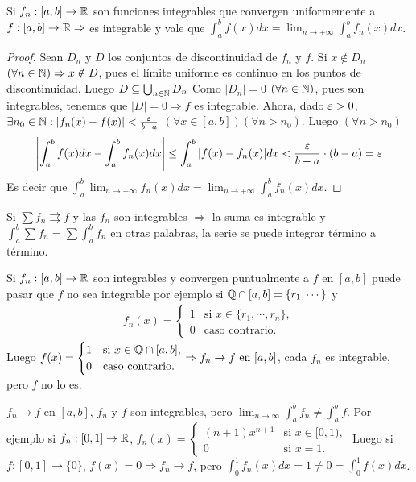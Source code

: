\begin{theorem}
  Si $f_n: [a, b] \to \mathbb{R}$ son funciones integrables que convergen uniformemente a $f: [a, b] \to \mathbb{R} \Rightarrow$ es integrable y vale que $\int_a^b f(x) dx = \lim_{n \to +\infty} \int_a^b f_n(x) dx$.
  \begin{proof}
    Sean $D_n$ y $D$ los conjuntos de discontinuidad de $f_n$ y $f$. Si $x \notin D_n$ $(\forall n \in \mathbb{N}) \Rightarrow x \notin D$,
    pues el límite uniforme es continuo en los puntos de discontinuidad.
    Luego $D \subseteq \bigcup_{n \in \mathbb{N}} D_n$ Como $|D_n| = 0$ $(\forall n \in \mathbb{N})$, pues son integrables,
    tenemos que $|D| = 0 \Rightarrow f$ es integrable. Ahora, dado $\varepsilon > 0$,
    $\exists n_0 \in \mathbb{N} : |f_n(x) - f(x)| < \frac{\varepsilon}{b-a}$ $(\forall x \in [a, b])(\forall n > n_0)$. Luego $(\forall n > n_0)$
    \begin{align*}
      \left|\int_a^b f(x) dx - \int_a^b f_n(x) dx\right| \leq \int_a^b |f(x) - f_n(x)|dx < \frac{\varepsilon}{b-a} \cdot (b-a) = \varepsilon
    \end{align*}
    Es decir que $\int_a^b \lim_{n \to +\infty} f_n(x) dx = \lim_{n \to +\infty} \int_a^b f_n(x) dx$.
  \end{proof}
\end{theorem}

\begin{corollary}
  Si $\sum f_n \rightrightarrows f$ y las $f_n$ son integrables $\Rightarrow$ la suma es integrable y $\int_a^b \sum f_n = \sum \int_a^b f_n$ en otras palabras, la serie se puede integrar término a término.
\end{corollary}

\begin{note}
  Si $f_n: [a, b] \to \mathbb{R}$ son integrables y convergen puntualmente a $f$ en $[a, b]$ puede pasar que $f$ no sea integrable por ejemplo si $\mathbb{Q} \cap [a, b] = \{r_1, \cdots\}$ y
  \begin{align*}
    f_n(x) = \begin{cases}
               1 & \text{si } x \in \{r_1, \cdots, r_n\}, \\
               0 & \text{caso contrario}.
             \end{cases}
  \end{align*}
  Luego $f(x) = \begin{cases}
      1 & \text{si } x \in \mathbb{Q} \cap [a, b], \\
      0 & \text{caso contrario}.
    \end{cases} \Rightarrow f_n \to f \text{ en } [a, b]$, cada $f_n$ es integrable, pero $f$ no lo es.
\end{note}

\begin{note}
  $f_n \to f$ en $[a, b]$, $f_n$ y $f$ son integrables, pero $\lim_{n \to \infty} \int_a^b f_n \neq \int_a^b f$. Por ejemplo si $f_n: [0, 1] \to \mathbb{R}$, $f_n(x) = \begin{cases}
      (n+1) x^{n+1} & \text{si } x \in [0, 1), \\
      0             & \text{si } x = 1.
    \end{cases}$ Luego si $f: [0, 1] \to \{0\}$, $f(x) = 0 \Rightarrow f_n \to f$, pero $\int_0^1 f_n(x) dx = 1 \neq 0 = \int_0^1 f(x) dx$.
\end{note}
